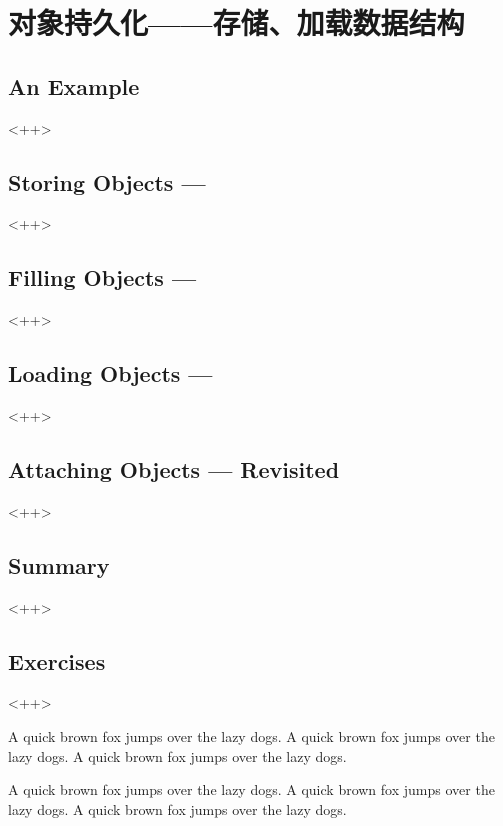

\chapter{对象持久化——存储、加载数据结构}
\label{ch:PersistentObjects}

\section{An Example}<++>

\section{Storing Objects ---}<++>

\section{Filling Objects ---}<++>

\section{Loading Objects ---}<++>

\section{Attaching Objects --- Revisited}<++>

\section{Summary}<++>

\section{Exercises}<++>

A quick brown fox jumps over the lazy dogs.
A quick brown fox jumps over the lazy dogs.
A quick brown fox jumps over the lazy dogs.

A quick brown fox jumps over the lazy dogs.
A quick brown fox jumps over the lazy dogs.
A quick brown fox jumps over the lazy dogs.


